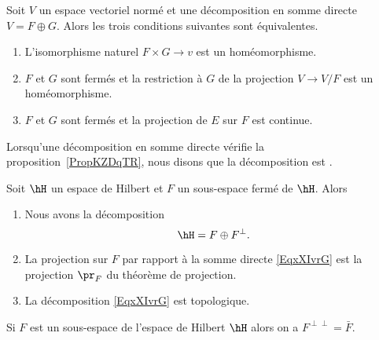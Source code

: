 \begin{proposition}     \label{PropKZDqTR}
    Soit \( V\) un espace vectoriel normé et une décomposition en somme directe \( V=F\oplus G\). Alors les trois conditions suivantes sont équivalentes.
    \begin{enumerate}
        \item
            L'isomorphisme naturel \( F\times G\to v\) est un homéomorphisme.
        \item
            \( F\) et \( G\) sont fermés et la restriction à \( G\) de la projection \( V\to V/F\) est un homéomorphisme.
        \item
            \( F\) et \( G\) sont fermés et la projection de \( E\) sur \( F\) est continue.
    \end{enumerate}
\end{proposition}
Lorsqu'une décomposition en somme directe vérifie la proposition~\ref{PropKZDqTR}, nous disons que la décomposition est .

\begin{theorem}     \label{ThowZyaiz}
    Soit \( \hH\) un espace de Hilbert et \( F\) un sous-espace fermé de \( \hH\). Alors
    \begin{enumerate}
        \item
            Nous avons la décomposition
            \begin{equation}        \label{EqxXIvrG}
                \hH=F\oplus F^{\perp}.
            \end{equation}
        \item       \label{ItemThowZyaizii}
            La projection sur \( F\) par rapport à la somme directe \eqref{EqxXIvrG} est la projection \( \pr_F\) du théorème de projection.
        \item
            La décomposition \eqref{EqxXIvrG} est topologique.
    \end{enumerate}
\end{theorem}

\begin{proposition}
    Si \( F\) est un sous-espace de l'espace de Hilbert \( \hH\) alors on a \( F^{\perp\perp}=\bar F\).
\end{proposition}

